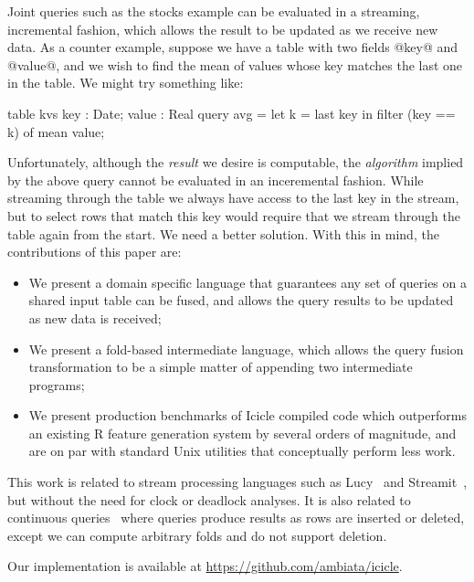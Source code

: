 Joint queries such as the stocks example can be evaluated in a streaming, incremental fashion, which allows the result to be updated as we receive new data. As a counter example, suppose we have a table with two fields @key@ and @value@, and we wish to find the mean of values whose key matches the last one in the table. We might try something like:
\begin{code}
  table kvs { key : Date; value : Real }
  query avg = let k = last key
              in  filter (key == k) of mean value;
\end{code}
Unfortunately, although the \emph{result} we desire is computable, the \emph{algorithm} implied by the above query cannot be evaluated in an inceremental fashion. While streaming through the table we always have access to the last key in the stream, but to select rows that match this key would require that we stream through the table again from the start. We need a better solution. With this in mind, the contributions of this paper are:
\begin{itemize}
\item
We present a domain specific language that guarantees any set of queries on a shared input table can be fused, and allows the query results to be updated as new data is received;

\item
We present a fold-based intermediate language, which allows the query fusion transformation to be a simple matter of appending two intermediate programs;

\item
We present production benchmarks of Icicle compiled code which outperforms an existing R feature generation system by several orders of magnitude, and are on par with standard Unix utilities that conceptually perform less work.
\end{itemize}


This work is related to stream processing languages such as Lucy~\cite{mandel2010lucy} and Streamit~\cite{thies2002streamit}, but without the need for clock or deadlock analyses.
It is also related to continuous queries~\cite{arasu2003cql} where queries produce results as rows are inserted or deleted, except we can compute arbitrary folds and do not support deletion.

Our implementation is available at \url{https://github.com/ambiata/icicle}.

